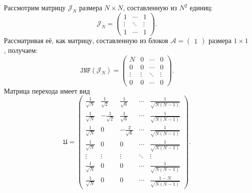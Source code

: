  \begin{example}
     Рассмотрим матрицу \( \mathcal{J}_N \) размера \( N\times N \), составленную из \( N^2 \) единиц:
     \[ \mathcal{J}_N =
        \begin{pmatrix}
            1 & \cdots & 1 \\
            \vdots & \ddots & \vdots \\
            1 & \cdots & 1
        \end{pmatrix}. \]
     Рассматривая её, как матрицу, составленную из блоков \( \mathcal{A}=\begin{pmatrix} 1 \end{pmatrix} \)
     размера \( 1\times 1 \), получаем:
     \[
         \mathtt{JNF}(\mathcal{J}_N) =
         \left(
         \begin{array}{c|ccc}
             N & 0 & \cdots & 0 \\ \hline
             0 & 0 & \cdots & 0 \\
             \vdots & \vdots  & \ddots & \vdots \\
             0 & 0 & \cdots & 0
         \end{array}\right). \]
     Матрица перехода имеет вид
     \[
         \mathfrak{U} = 
            \begin{pmatrix}
                \frac{1}{\sqrt N} &  \frac{1}{\sqrt2} &  \frac{1}{\sqrt{6}} & \cdots & \frac{1}{\sqrt{N(N-1)}} \\
                \frac{1}{\sqrt N} & -\frac{1}{\sqrt2} &  \frac{1}{\sqrt{6}} & \cdots & \frac{1}{\sqrt{N(N-1)}} \\
                \frac{1}{\sqrt N} & 0                 & -\frac{2}{\sqrt{6}} & \cdots & \frac{1}{\sqrt{N(N-1)}} \\
                \frac{1}{\sqrt N} & 0                 &  0                  & \cdots & \frac{1}{\sqrt{N(N-1)}} \\
                \vdots            & \vdots            &  \vdots             & \ddots & \vdots \\
                \frac{1}{\sqrt N} & 0                 &  0                  & \cdots & \frac{1}{\sqrt{N(N-1)}} \\
                \frac{1}{\sqrt N} & 0                 &  0                  & \cdots & \frac{1-N}{\sqrt{N(N-1)}}
            \end{pmatrix}.
         \]
 \end{example}

